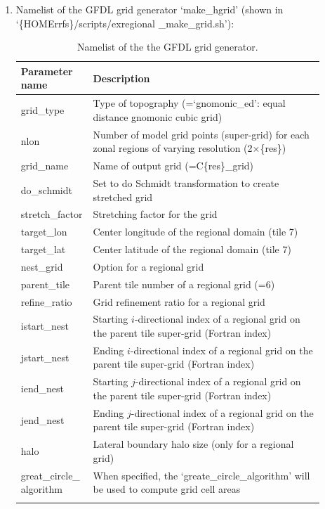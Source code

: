 \documentclass[11pt,fleqn]{report}              %
\begin{document}
\begin{enumerate}
\item Namelist of the GFDL grid generator `make\_hgrid' (shown in `\{HOMErrfs\}/scripts/exregional \_make\_grid.sh'):

{
\fontsize{10}{12}\selectfont
\begin{longtable}{p{0.15\linewidth} | p{0.75\linewidth} }
\hline
\hline
 Parameter name & Description \\
\hline
 grid\_type & Type of topography (=`gnomonic\_ed': equal distance gnomonic cubic grid) \\
 nlon & Number of model grid points (super-grid) for each zonal regions of varying resolution (2$\times$\{res\}) \\
 grid\_name & Name of output grid (=C\{res\}\_grid) \\
 do\_schmidt & Set to do Schmidt transformation to create stretched grid \\
 stretch\_factor & Stretching factor for the grid \\
 target\_lon & Center longitude of the regional domain (tile 7) \\
 target\_lat & Center latitude of the regional domain (tile 7) \\
 nest\_grid &  Option for a regional grid\\
 parent\_tile & Parent tile number of a regional grid (=6)\\
 refine\_ratio & Grid refinement ratio for a regional grid \\
 istart\_nest & Starting $i$-directional index of a regional grid on the parent tile super-grid (Fortran index) \\
 jstart\_nest & Ending $i$-directional index of a regional grid on the parent tile super-grid (Fortran index) \\
 iend\_nest & Starting $j$-directional index of a regional grid on the parent tile super-grid (Fortran index) \\
 jend\_nest & Ending $j$-directional index of a regional grid on the parent tile super-grid (Fortran index) \\
 halo & Lateral boundary halo size (only for a regional grid) \\
 great\_circle\_ algorithm & When specified, the `greate\_circle\_algorithm' will be used to compute grid cell areas \\
\hline
\caption{Namelist of the the GFDL grid generator.}
\label{table:namelist_gfdl_grid}
\end{longtable}
}


\end{enumerate}
\end{document}
